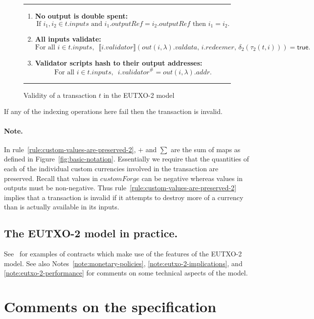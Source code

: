 \documentclass[a4paper]{article}
\newcounter{note}
\newcommand\rfskip{7pt}
\newenvironment{ruledfigure}[1]{\begin{figure}[#1]\hrule\vspace{\rfskip}}{\vspace{\rfskip}\hrule\end{figure}}
\newcommand{\true}{\textsf{true}}
\newcommand{\mi}[1]{\ensuremath{\mathit{#1}}}
\newcommand{\inputs}{\mi{inputs}}
\newcommand{\addr}{\mi{addr}}
\newcommand{\customforge}{\mi{customForge}}
\newcommand{\validator}{\mi{validator}}
\newcommand{\redeemer}{\mi{redeemer}}
\newcommand{\valdata}{\mi{valdata}}
\newcommand{\txout}{\mi{out}}
\begin{document}
\begin{ruledfigure}{H}
\begin{enumerate}
\begin{minipage}{0.85\textwidth}
          \end{minipage}
    \item \label{rule:no-double-spending-2} \textbf{No output is double spent:}
    \[
     \textrm{If } i_1, i_2 \in t.\inputs \textrm{ and }  i_1.\mathit{outputRef} = i_2.\mathit{outputRef}
     \textrm{ then } i_1 = i_2.
    \]
    \item\label{rule:all-inputs-validate-2} \textbf{All inputs validate:}
    \[
    \textrm{For all } i \in t.\inputs,\enspace \llbracket
    i.\validator\rrbracket(\txout(i,\lambda).\valdata,\, i.\redeemer,\, \delta_2(\tau_2(t, i))) = \true.
      \]
    \item\label{rule:validator-scripts-hash-2} \textbf{Validator scripts hash to their output addresses:}
    \[
      \textrm{For all } i \in t.\inputs,\enspace i.\validator^{\#} = \txout(i, \lambda).\addr.
    \]
  \end{enumerate}
  \caption{Validity of a transaction $t$ in the EUTXO-2 model}
  \label{fig:eutxo-2-validity}

\end{ruledfigure}

\noindent If any of the indexing operations here fail then the
transaction is invalid.

\paragraph{Note.} In rule~\ref{rule:custom-values-are-preserved-2},
$+$ and $\sum$ are the sum of maps as defined in
Figure~\ref{fig:basic-notation}. Essentially we require that the
quantities of each of the individual custom currencies involved in the
transaction are preserved.  Recall that values in $\customforge$ can
be negative whereas values in outputs must be non-negative.  Thus
rule~\ref{rule:custom-values-are-preserved-2} implies that a
transaction is invalid if it attempts to destroy more of a currency
than is actually available in its inputs.

\subsection{The EUTXO-2 model in practice.}
See~\cite{Plutus-book} for examples of contracts which make use of the
features of the EUTXO-2 model.  See also
Notes~\ref{note:monetary-policies}, \ref{note:eutxo-2-implications},
and \ref{note:eutxo-2-performance} for comments on some technical
aspects of the model.

\appendix
\section{Comments on the specification}
\label{appendix:comments}
\end{document}
